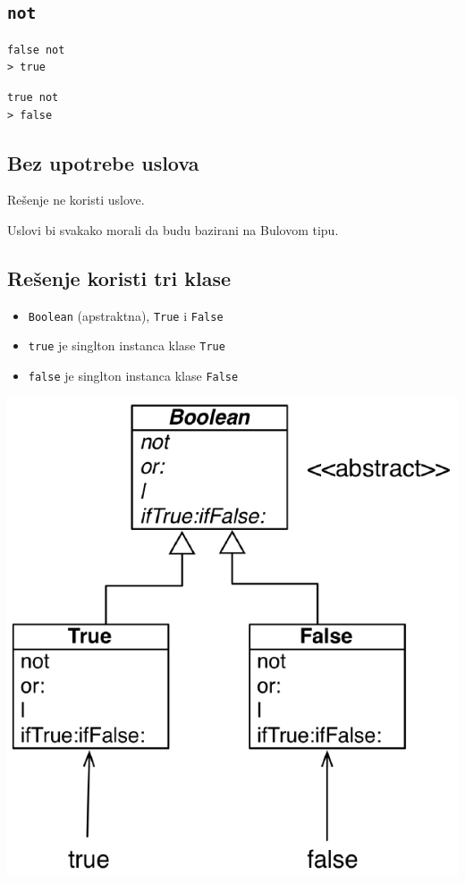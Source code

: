 \documentclass[presentation]{beamer}
\begin{document}
\subsection{\texttt{not}}
\label{sec:org08db138}

\begin{verbatim}
false not
> true
\end{verbatim}

\begin{verbatim}
true not
> false
\end{verbatim}

\subsection{Bez upotrebe uslova}
\label{sec:org499aed3}

Rešenje ne koristi uslove.

Uslovi bi svakako morali da budu bazirani na Bulovom tipu.

\subsection{Rešenje koristi tri klase}
\label{sec:orga7aa06f}

\begin{itemize}
\item \texttt{Boolean} (apstraktna), \texttt{True} i \texttt{False}
\item \texttt{true} je singlton instanca klase \texttt{True}
\item \texttt{false} je singlton instanca klase \texttt{False}
\end{itemize}

\begin{center}
\includegraphics[width=.9\linewidth]{./slike/boolean.png}
\end{center}
\end{document}
